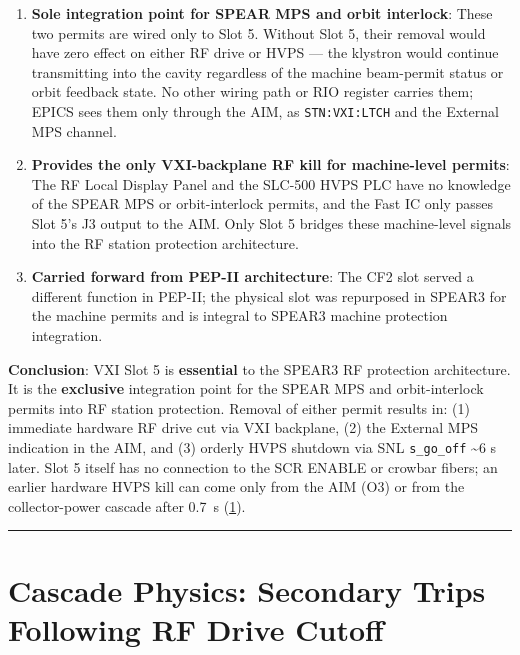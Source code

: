 \begin{enumerate}
\def\labelenumi{\arabic{enumi}.}
\item
  \textbf{Sole integration point for SPEAR MPS and orbit interlock}: These two permits are wired only to Slot 5. Without Slot 5, their removal would have zero effect on either RF drive or HVPS --- the klystron would continue transmitting into the cavity regardless of the machine beam-permit status or orbit feedback state. No other wiring path or RIO register carries them; EPICS sees them only through the AIM, as \texttt{STN:VXI:LTCH} and the External MPS channel.
\item
  \textbf{Provides the only VXI-backplane RF kill for machine-level permits}: The RF Local Display Panel and the SLC-500 HVPS PLC have no knowledge of the SPEAR MPS or orbit-interlock permits, and the Fast IC only passes Slot 5's J3 output to the AIM. Only Slot 5 bridges these machine-level signals into the RF station protection architecture.
\item
  \textbf{Carried forward from PEP-II architecture}: The CF2 slot served a different function in PEP-II; the physical slot was repurposed in SPEAR3 for the machine permits and is integral to SPEAR3 machine protection integration.
\end{enumerate}

\begin{keynote}
\textbf{Conclusion}: VXI Slot 5 is \textbf{essential} to the SPEAR3 RF protection architecture. It is the \textbf{exclusive} integration point for the SPEAR MPS and orbit-interlock permits into RF station protection. Removal of either permit results in: (1) immediate hardware RF drive cut via VXI backplane, (2) the External MPS indication in the AIM, and (3) orderly HVPS shutdown via SNL \texttt{s\_go\_off} \textasciitilde6 s later. Slot 5 itself has no connection to the SCR ENABLE or crowbar fibers; an earlier hardware HVPS kill can come only from the AIM (O3) or from the collector-power cascade after \qty{0.7}{\second} (\cref{sec:cascade}).
\end{keynote}

\begin{center}\rule{0.5\linewidth}{0.5pt}\end{center}

\section{Cascade Physics: Secondary Trips Following RF Drive Cutoff}\label{sec:cascade}

